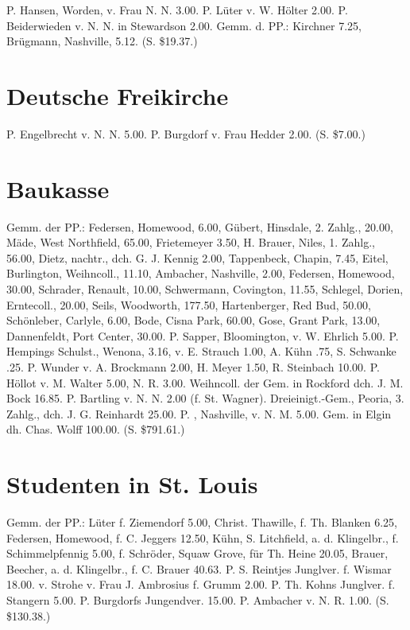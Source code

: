 P. Hansen, Worden, v. Frau N. N. 3.00. P. Lüter v. W. Hölter 2.00. P. Beiderwieden v. N. N. in Stewardson 2.00. Gemm. d. PP.: Kirchner 7.25, Brügmann, Nashville, 5.12. (S. \$19.37.)

\section{Deutsche Freikirche}

P. Engelbrecht v. N. N. 5.00. P. Burgdorf v. Frau Hedder 2.00. (S. \$7.00.)

\section{Baukasse}

Gemm. der PP.: Federsen, Homewood, 6.00, Gübert, Hinsdale, 2. Zahlg., 20.00, Mäde, West Northfield, 65.00, Frietemeyer 3.50, H. Brauer, Niles, 1. Zahlg., 56.00, Dietz, nachtr., dch. G. J. Kennig 2.00, Tappenbeck, Chapin, 7.45, Eitel, Burlington, Weihncoll., 11.10, Ambacher, Nashville, 2.00, Federsen, Homewood, 30.00, Schrader, Renault, 10.00, Schwermann, Covington, 11.55, Schlegel, Dorien, Erntecoll., 20.00, Seils, Woodworth, 177.50, Hartenberger, Red Bud, 50.00, Schönleber, Carlyle, 6.00, Bode, Cisna Park, 60.00, Gose, Grant Park, 13.00, Dannenfeldt, Port Center, 30.00. P. Sapper, Bloomington, v. W. Ehrlich 5.00. P. Hempings Schulst., Wenona, 3.16, v. E. Strauch 1.00, A. Kühn .75, S. Schwanke .25. P. Wunder v. A. Brockmann 2.00, H. Meyer 1.50, R. Steinbach 10.00. P. Höllot v. M. Walter 5.00, N. R. 3.00. Weihncoll. der Gem. in Rockford dch. J. M. Bock 16.85. P. Bartling v. N. N. 2.00 (f. St. Wagner). Dreieinigt.-Gem., Peoria, 3. Zahlg., dch. J. G. Reinhardt 25.00. P. ,
Nashville, v. N. M. 5.00. Gem. in Elgin dh. Chas. Wolff 100.00. (S. \$791.61.)

\section{Studenten in St. Louis}

Gemm. der PP.: Lüter f. Ziemendorf 5.00, Christ. Thawille, f. Th. Blanken 6.25, Federsen, Homewood, f. C. Jeggers 12.50, Kühn, S. Litchfield, a. d. Klingelbr., f. Schimmelpfennig 5.00, f. Schröder, Squaw Grove, für Th. Heine 20.05, Brauer, Beecher, a. d. Klingelbr., f. C. Brauer 40.63. P. S. Reintjes Junglver. f. Wismar 18.00. v. Strohe v. Frau J. Ambrosius f. Grumm 2.00. P. Th. Kohns Junglver. f. Stangern 5.00. P. Burgdorfs Jungendver. 15.00. P. Ambacher v. N. R. 1.00. (S. \$130.38.)

